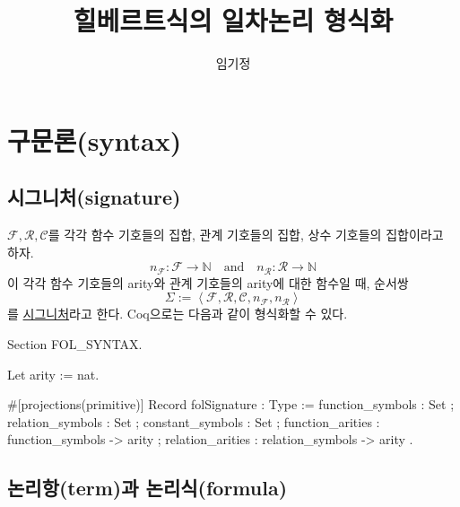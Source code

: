 \documentclass[12pt]{paper}
\title{힐베르트식의 일차논리 형식화}
\author{임기정}
\begin{document}
\maketitle

\section{구문론(syntax)}

\subsection{시그니처(signature)}

$\mathcal{F}, \mathcal{R}, \mathcal{C}$를
각각 함수 기호들의 집합, 관계 기호들의 집합, 상수 기호들의 집합이라고 하자.
$$n_\mathcal{F} : \mathcal{F} \to \mathbb{N} \quad \mathrm{and} \quad n_\mathcal{R} : \mathcal{R} \to \mathbb{N}$$
이 각각 함수 기호들의 arity와 관계 기호들의 arity에 대한 함수일 때, 순서쌍
$$ \Sigma := \left\langle \mathcal{F}, \mathcal{R}, \mathcal{C}, n_\mathcal{F} , n_\mathcal{R} \right\rangle $$
를 \underline{시그니처}라고 한다.
Coq으로는 다음과 같이 형식화할 수 있다.
\begin{coqcode}
Section FOL_SYNTAX.

Let arity := nat.
    
#[projections(primitive)]
Record folSignature : Type :=
  { function_symbols : Set
  ; relation_symbols : Set
  ; constant_symbols : Set
  ; function_arities : function_symbols -> arity
  ; relation_arities : relation_symbols -> arity
  }.
\end{coqcode}

\newpage

\subsection[short]{논리항(term)과 논리식(formula)}
\end{document}
